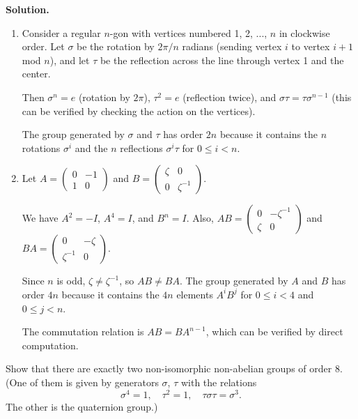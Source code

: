 \noindent\textbf{Solution.}
\begin{enumerate}[label=(\alph*)]
\item Consider a regular $n$-gon with vertices numbered 1, 2, ..., $n$ in clockwise order. Let $\sigma$ be the rotation by $2\pi/n$ radians (sending vertex $i$ to vertex $i+1$ mod $n$), and let $\tau$ be the reflection across the line through vertex 1 and the center.

Then $\sigma^n = e$ (rotation by $2\pi$), $\tau^2 = e$ (reflection twice), and $\sigma\tau = \tau\sigma^{n-1}$ (this can be verified by checking the action on the vertices).

The group generated by $\sigma$ and $\tau$ has order $2n$ because it contains the $n$ rotations $\sigma^i$ and the $n$ reflections $\sigma^i\tau$ for $0 \leq i < n$.

\item Let $A = \begin{pmatrix} 0 & -1 \\ 1 & 0 \end{pmatrix}$ and $B = \begin{pmatrix} \zeta & 0 \\ 0 & \zeta^{-1} \end{pmatrix}$.

We have $A^2 = -I$, $A^4 = I$, and $B^n = I$. Also, $AB = \begin{pmatrix} 0 & -\zeta^{-1} \\ \zeta & 0 \end{pmatrix}$ and $BA = \begin{pmatrix} 0 & -\zeta \\ \zeta^{-1} & 0 \end{pmatrix}$.

Since $n$ is odd, $\zeta \neq \zeta^{-1}$, so $AB \neq BA$. The group generated by $A$ and $B$ has order $4n$ because it contains the $4n$ elements $A^iB^j$ for $0 \leq i < 4$ and $0 \leq j < n$.

The commutation relation is $AB = BA^{n-1}$, which can be verified by direct computation.
\end{enumerate}

\begin{problembox}
Show that there are exactly two non-isomorphic non-abelian groups of order 8. (One of them is given by generators $\sigma$, $\tau$ with the relations
\[\sigma^4 = 1, \quad \tau^2 = 1, \quad \tau\sigma\tau = \sigma^3.\]
The other is the quaternion group.)
\end{problembox}

